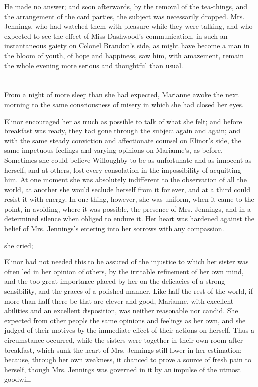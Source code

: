 He made no answer; and soon afterwards, by the removal of the tea-things, and the arrangement of the card parties, the subject was necessarily dropped. Mrs. Jennings, who had watched them with pleasure while they were talking, and who expected to see the effect of Miss Dashwood's communication, in such an instantaneous gaiety on Colonel Brandon's side, as might have become a man in the bloom of youth, of hope and happiness, saw him, with amazement, remain the whole evening more serious and thoughtful than usual.

\chapter{} %

From a night of more sleep than she had expected, Marianne awoke the next morning to the same consciousness of misery in which she had closed her eyes.

Elinor encouraged her as much as possible to talk of what she felt; and before breakfast was ready, they had gone through the subject again and again; and with the same steady conviction and affectionate counsel on Elinor's side, the same impetuous feelings and varying opinions on Marianne's, as before. Sometimes she could believe Willoughby to be as unfortunate and as innocent as herself, and at others, lost every consolation in the impossibility of acquitting him. At one moment she was absolutely indifferent to the observation of all the world, at another she would seclude herself from it for ever, and at a third could resist it with energy. In one thing, however, she was uniform, when it came to the point, in avoiding, where it was possible, the presence of Mrs. Jennings, and in a determined silence when obliged to endure it. Her heart was hardened against the belief of Mrs. Jennings's entering into her sorrows with any compassion.

 she cried; 

Elinor had not needed this to be assured of the injustice to which her sister was often led in her opinion of others, by the irritable refinement of her own mind, and the too great importance placed by her on the delicacies of a strong sensibility, and the graces of a polished manner. Like half the rest of the world, if more than half there be that are clever and good, Marianne, with excellent abilities and an excellent disposition, was neither reasonable nor candid. She expected from other people the same opinions and feelings as her own, and she judged of their motives by the immediate effect of their actions on herself. Thus a circumstance occurred, while the sisters were together in their own room after breakfast, which sunk the heart of Mrs. Jennings still lower in her estimation; because, through her own weakness, it chanced to prove a source of fresh pain to herself, though Mrs. Jennings was governed in it by an impulse of the utmost goodwill.

